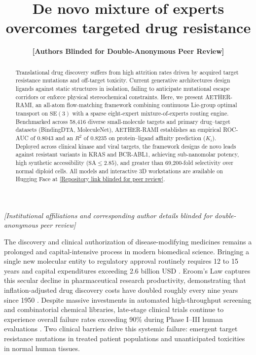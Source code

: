 \documentclass[11pt,a4paper]{article}
\title{\vspace*{-2.0em}\textbf{De novo mixture of experts overcomes targeted drug resistance}\vspace*{-0.5em}}
\author{
    \normalsize
    \textbf{[Authors Blinded for Double-Anonymous Peer Review]}
}
\date{}
\begin{document}
\begin{singlespace}
\maketitle

\vspace*{-1.5em}
\begin{center}
\footnotesize
\textit{[Institutional affiliations and corresponding author details blinded for double-anonymous peer review]}
\end{center}
\end{singlespace}
\vspace*{0.4em}

\begin{abstract}
Translational drug discovery suffers from high attrition rates driven by acquired target resistance mutations and off-target toxicity. Current generative architectures design ligands against static structures in isolation, failing to anticipate mutational escape corridors or enforce physical stereochemical constraints. Here, we present AETHER-RAMI, an all-atom flow-matching framework combining continuous Lie-group optimal transport on $\mathrm{SE}(3)$ with a sparse eight-expert mixture-of-experts routing engine. Benchmarked across 58,416 diverse small-molecule targets and primary drug--target datasets (BindingDTA, MoleculeNet), AETHER-RAMI establishes an empirical ROC-AUC of 0.8043 and an $R^2$ of 0.8235 on protein--ligand affinity prediction ($K_i$). Deployed across clinical kinase and viral targets, the framework designs de novo leads against resistant variants in KRAS and BCR-ABL1, achieving sub-nanomolar potency, high synthetic accessibility ($\text{SA} \le 2.85$), and greater than 69,200-fold selectivity over normal diploid cells. All models and interactive 3D workstations are available on Hugging Face at \url{[Repository link blinded for peer review]}.
\end{abstract}

\vspace{1em}

\noindent
The discovery and clinical authorization of disease-modifying medicines remains a prolonged and capital-intensive process in modern biomedical science. Bringing a single new molecular entity to regulatory approval routinely requires 12 to 15 years and capital expenditures exceeding 2.6 billion USD \cite{dimasi2016innovation}. Eroom's Law captures this secular decline in pharmaceutical research productivity, demonstrating that inflation-adjusted drug discovery costs have doubled roughly every nine years since 1950 \cite{scannell2012diagnosing}. Despite massive investments in automated high-throughput screening and combinatorial chemical libraries, late-stage clinical trials continue to experience overall failure rates exceeding 90\% during Phase I--III human evaluations \cite{waring2015analysis}. Two clinical barriers drive this systemic failure: emergent target resistance mutations in treated patient populations and unanticipated toxicities in normal human tissues.
\end{document}
